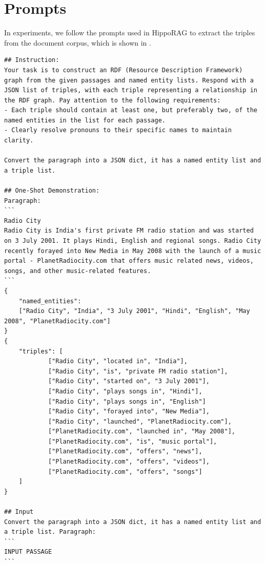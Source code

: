 \section{Prompts}\label{app:prompt}

In experiments, we follow the prompts used in HippoRAG \citep{gutiérrez2024hipporag} to extract the triples from the document corpus, which is shown in .

\begin{table}
    \centering
    \begin{tcolorbox}[title=OpenIE Prompt]
    \small
    \begin{lstlisting}
## Instruction:  
Your task is to construct an RDF (Resource Description Framework) graph from the given passages and named entity lists. Respond with a JSON list of triples, with each triple representing a relationship in the RDF graph. Pay attention to the following requirements: 
- Each triple should contain at least one, but preferably two, of the named entities in the list for each passage.
- Clearly resolve pronouns to their specific names to maintain clarity.  

Convert the paragraph into a JSON dict, it has a named entity list and a triple list.

## One-Shot Demonstration:
Paragraph:
```
Radio City
Radio City is India's first private FM radio station and was started on 3 July 2001. It plays Hindi, English and regional songs. Radio City recently forayed into New Media in May 2008 with the launch of a music portal - PlanetRadiocity.com that offers music related news, videos, songs, and other music-related features.
```
{
    "named_entities":
    ["Radio City", "India", "3 July 2001", "Hindi", "English", "May 2008", "PlanetRadiocity.com"]
}
{
    "triples": [
            ["Radio City", "located in", "India"],
            ["Radio City", "is", "private FM radio station"],
            ["Radio City", "started on", "3 July 2001"],
            ["Radio City", "plays songs in", "Hindi"],
            ["Radio City", "plays songs in", "English"]
            ["Radio City", "forayed into", "New Media"],
            ["Radio City", "launched", "PlanetRadiocity.com"],
            ["PlanetRadiocity.com", "launched in", "May 2008"],
            ["PlanetRadiocity.com", "is", "music portal"],
            ["PlanetRadiocity.com", "offers", "news"],
            ["PlanetRadiocity.com", "offers", "videos"],
            ["PlanetRadiocity.com", "offers", "songs"]
    ]
}

## Input
Convert the paragraph into a JSON dict, it has a named entity list and a triple list. Paragraph:
```
INPUT PASSAGE
```
        \end{lstlisting}
    \end{tcolorbox}
    \caption{The prompt for OpenIE extraction.}
\label{tab:prompt}
\end{table}

